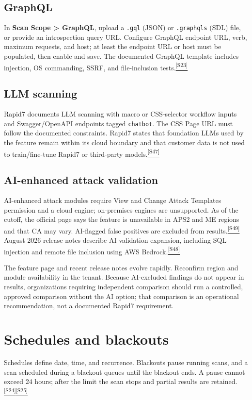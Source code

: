 \documentclass[11pt,letterpaper,oneside]{scrreprt}
\newcommand{\src}[1]{\hyperref[src:#1]{\textsuperscript{\color{R7Orange}[#1]}}}
\newcommand{\uipath}[1]{\textsf{\textbf{#1}}}
\newcommand{\code}[1]{\texttt{#1}}
\begin{document}
\subsection{GraphQL}
In \uipath{Scan Scope > GraphQL}, upload a \code{.gql} (JSON) or \code{.graphqls} (SDL) file, or provide an introspection query URL. Configure GraphQL endpoint URL, verb, maximum requests, and host; at least the endpoint URL or host must be populated, then enable and save. The documented GraphQL template includes injection, OS commanding, SSRF, and file-inclusion tests.\src{S23}

\subsection{LLM scanning}
Rapid7 documents LLM scanning with macro or CSS-selector workflow inputs and Swagger/OpenAPI endpoints tagged \code{chatbot}. The CSS Page URL must follow the documented constraints. Rapid7 states that foundation LLMs used by the feature remain within its cloud boundary and that customer data is not used to train/fine-tune Rapid7 or third-party models.\src{S47}

\subsection{AI-enhanced attack validation}
AI-enhanced attack modules require View and Change Attack Templates permission and a cloud engine; on-premises engines are unsupported. As of the cutoff, the official page says the feature is unavailable in APS2 and ME regions and that CA may vary. AI-flagged false positives are excluded from results.\src{S49} August 2026 release notes describe AI validation expansion, including SQL injection and remote file inclusion using AWS Bedrock.\src{S48}

\begin{docgap}
The feature page and recent release notes evolve rapidly. Reconfirm region and module availability in the tenant. Because AI-excluded findings do not appear in results, organizations requiring independent comparison should run a controlled, approved comparison without the AI option; that comparison is an operational recommendation, not a documented Rapid7 requirement.
\end{docgap}

\section{Schedules and blackouts}
Schedules define date, time, and recurrence. Blackouts pause running scans, and a scan scheduled during a blackout queues until the blackout ends. A pause cannot exceed 24 hours; after the limit the scan stops and partial results are retained.\src{S24}\src{S25}
\end{document}
